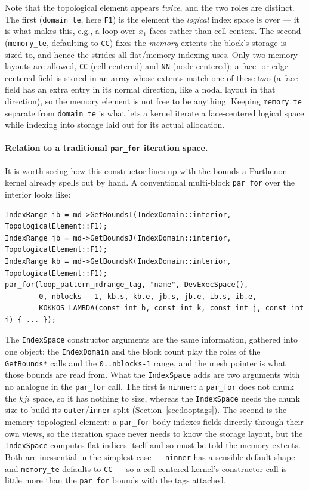 \documentclass[11pt]{article}
\newcommand{\code}[1]{\lstinline[basicstyle=\ttfamily]|#1|}
\begin{document}
Note that the topological element appears \emph{twice}, and the two roles are
distinct. The first (\code{domain_te}, here \code{F1}) is the element the
\emph{logical} index space is over --- it is what makes this, e.g., a loop over
$x_1$ faces rather than cell centers. The second (\code{memory_te}, defaulting to
\code{CC}) fixes the \emph{memory} extents the block's storage is sized to, and
hence the strides all flat/memory indexing uses. Only two memory layouts are
allowed, \code{CC} (cell-centered) and \code{NN} (node-centered): a face- or
edge-centered field is stored in an array whose extents match one of these two
(a face field has an extra entry in its normal direction, like a nodal layout in
that direction), so the memory element is not free to be anything. Keeping
\code{memory_te} separate from \code{domain_te} is what lets a kernel iterate a
face-centered logical space while indexing into storage laid out for its actual
allocation.

\paragraph{Relation to a traditional \code{par_for} iteration space.} It is worth
seeing how this constructor lines up with the bounds a Parthenon kernel already
spells out by hand. A conventional multi-block \code{par_for} over the interior
looks like:
\begin{lstlisting}
IndexRange ib = md->GetBoundsI(IndexDomain::interior, TopologicalElement::F1);
IndexRange jb = md->GetBoundsJ(IndexDomain::interior, TopologicalElement::F1);
IndexRange kb = md->GetBoundsK(IndexDomain::interior, TopologicalElement::F1);
par_for(loop_pattern_mdrange_tag, "name", DevExecSpace(),
        0, nblocks - 1, kb.s, kb.e, jb.s, jb.e, ib.s, ib.e,
        KOKKOS_LAMBDA(const int b, const int k, const int j, const int i) { ... });
\end{lstlisting}
The \code{IndexSpace} constructor arguments are the same information, gathered into
one object: the \code{IndexDomain} and the block count play the roles of the
\code{GetBounds*} calls and the \code{0..nblocks-1} range, and the mesh pointer is
what those bounds are read from. What the \code{IndexSpace} adds are two arguments
with no analogue in the \code{par_for} call. The first is \code{ninner}: a
\code{par_for} does not chunk the $kji$ space, so it has nothing to size, whereas
the \code{IndexSpace} needs the chunk size to build its \code{outer}/\code{inner}
split (Section~\ref{sec:looptags}). The second is the memory topological element:
a \code{par_for} body indexes fields directly through their own views, so the
iteration space never needs to know the storage layout, but the \code{IndexSpace}
computes flat indices itself and so must be told the memory extents. Both are
inessential in the simplest case --- \code{ninner} has a sensible default shape and
\code{memory_te} defaults to \code{CC} --- so a cell-centered kernel's constructor
call is little more than the \code{par_for} bounds with the tags attached.
\end{document}
